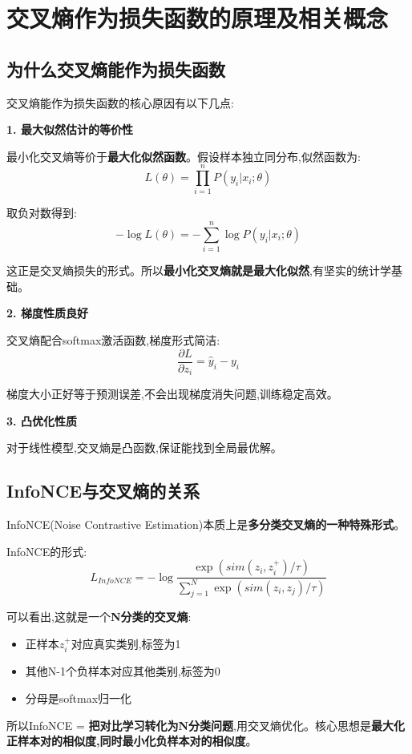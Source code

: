 \documentclass[UTF8]{ctexart}
\begin{document}
\section{交叉熵作为损失函数的原理及相关概念}

\subsection{为什么交叉熵能作为损失函数}

交叉熵能作为损失函数的核心原因有以下几点:

\textbf{1. 最大似然估计的等价性}

最小化交叉熵等价于\textbf{最大化似然函数}。假设样本独立同分布,似然函数为:
$$L(\theta) = \prod_{i=1}^{n}P(y_i|x_i;\theta)$$

取负对数得到:
$$-\log L(\theta) = -\sum_{i=1}^{n}\log P(y_i|x_i;\theta)$$

这正是交叉熵损失的形式。所以\textbf{最小化交叉熵就是最大化似然},有坚实的统计学基础。

\textbf{2. 梯度性质良好}

交叉熵配合softmax激活函数,梯度形式简洁:
$$\frac{\partial L}{\partial z_i} = \hat{y}_i - y_i$$

梯度大小正好等于预测误差,不会出现梯度消失问题,训练稳定高效。

\textbf{3. 凸优化性质}

对于线性模型,交叉熵是凸函数,保证能找到全局最优解。

\subsection{InfoNCE与交叉熵的关系}

InfoNCE(Noise Contrastive Estimation)本质上是\textbf{多分类交叉熵的一种特殊形式}。

InfoNCE的形式:
$$L_{InfoNCE} = -\log\frac{\exp(sim(z_i, z_i^+)/\tau)}{\sum_{j=1}^{N}\exp(sim(z_i, z_j)/\tau)}$$

可以看出,这就是一个\textbf{N分类的交叉熵}:
\begin{itemize}
    \item 正样本$z_i^+$对应真实类别,标签为1
    \item 其他N-1个负样本对应其他类别,标签为0
    \item 分母是softmax归一化
\end{itemize}

所以InfoNCE = \textbf{把对比学习转化为N分类问题},用交叉熵优化。核心思想是\textbf{最大化正样本对的相似度,同时最小化负样本对的相似度}。
\end{document}
